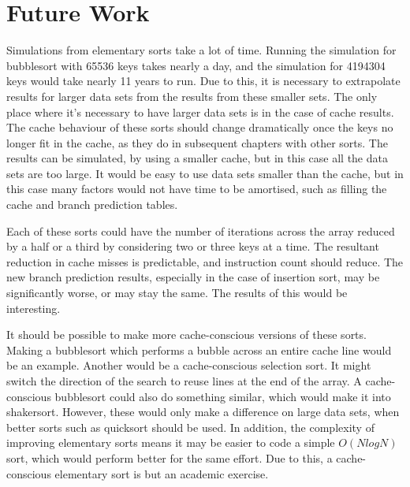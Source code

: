 \section{Future Work}
Simulations from elementary sorts take a lot of time. Running the simulation for
bubblesort with 65536 keys takes nearly a day, and the simulation for 4194304
keys would take nearly 11 years to run. Due to this, it is necessary to
extrapolate results for larger data sets from the results from these smaller
sets. The only place where it's necessary to have larger data sets is in the
case of cache results. The cache behaviour of these sorts should change
dramatically once the keys no longer fit in the cache, as they do in subsequent
chapters with other sorts. The results can be simulated, by using a
smaller cache, but in this case all the data sets are too large. It would be
easy to use data sets smaller than the cache, but in this case many factors
would not have time to be amortised, such as filling the cache and branch
prediction tables.

Each of these sorts could have the number of iterations across the array reduced
by a half or a third by considering two or three keys at a time. The resultant
reduction in cache misses is predictable, and instruction count should reduce.
The new branch prediction results, especially in the case of insertion sort, may
be significantly worse, or may stay the same. The results of this would be
interesting.

It should be possible to make more cache-conscious versions of these sorts.
Making a bubblesort which performs a bubble across an entire cache line would be
an example. Another would be a cache-conscious selection sort. It might switch
the direction of the search to reuse lines at the end of the array. A
cache-conscious bubblesort could also do something similar, which would make it
into shakersort. However, these would only make a difference on large data sets,
when better sorts such as quicksort should be used. In addition, the complexity
of improving elementary sorts means it may be easier to code a simple $O(NlogN)$
sort, which would perform better for the same effort. Due to this, a
cache-conscious elementary sort is but an academic exercise.
